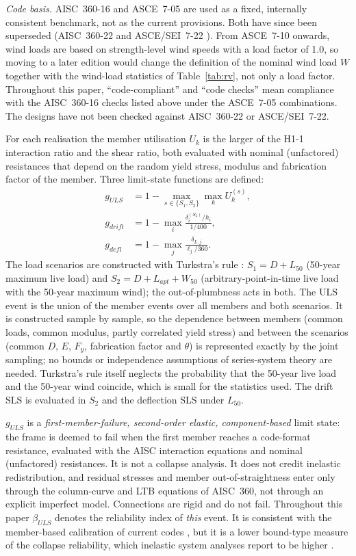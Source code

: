 \emph{Code basis.} AISC~360-16 and ASCE~7-05 are used as a fixed, internally consistent benchmark,
not as the current provisions. Both have since been superseded (AISC~360-22 \citep{AISC360_22} and
ASCE/SEI~7-22 \citep{ASCE722}). From ASCE~7-10 onwards, wind loads are based on strength-level wind
speeds with a load factor of 1.0, so moving to a later edition would change the definition of the
nominal wind load $W$ together with the wind-load statistics of Table~\ref{tab:rv}, not only a load
factor. Throughout this paper, ``code-compliant'' and ``code checks'' mean compliance with the
AISC~360-16 checks listed above under the ASCE~7-05 combinations. The designs have not been checked
against AISC~360-22 or ASCE/SEI~7-22.

For each realisation the member utilisation $U_k$ is the larger of the H1-1 interaction ratio
and the shear ratio, both evaluated with nominal (unfactored) resistances that depend on the
random yield stress, modulus and fabrication factor of the member. Three limit-state functions
are defined:
\begin{align}
g_{ULS} &= 1 - \max_{s\in\{S_1,S_2\}}\max_k U_k^{(s)}, \label{eq:gULS}\\
g_{drift} &= 1 - \max_i \frac{\delta_i^{(S_2)}/h_i}{1/400}, \label{eq:gdrift}\\
g_{defl} &= 1 - \max_j \frac{\delta_{L,j}}{\ell_j/360}. \label{eq:gdefl}
\end{align}
The load scenarios are constructed with Turkstra's rule \citep{TurkstraMadsen1980}:
$S_1 = D + L_{50}$ (50-year maximum live load) and $S_2 = D + L_{apt} + W_{50}$
(arbitrary-point-in-time live load with the 50-year maximum wind); the out-of-plumbness acts in
both. The ULS event is the union of the member events over all members and both scenarios. It is
constructed sample by sample, so the dependence between members (common loads, common modulus,
partly correlated yield stress) and between the scenarios (common $D$, $E$, $F_y$, fabrication
factor and $\theta$) is represented exactly by the joint sampling; no bounds or independence
assumptions of series-system theory are needed. Turkstra's rule itself neglects the probability
that the 50-year live load and the 50-year wind coincide, which is small for the statistics used.
The drift SLS is evaluated in $S_2$ and the deflection SLS under $L_{50}$.

$g_{ULS}$ is a \emph{first-member-failure, second-order elastic, component-based} limit state:
the frame is deemed to fail when the first member reaches a code-format resistance, evaluated with
the AISC interaction equations and nominal (unfactored) resistances. It is not a collapse
analysis. It does not credit inelastic redistribution, and residual stresses and member
out-of-straightness enter only through the column-curve and LTB equations of AISC~360, not through
an explicit imperfect model. Connections are rigid and do not fail. Throughout this paper
$\beta_{ULS}$ denotes the reliability index of \emph{this} event. It is consistent with the
member-based calibration of current codes \citep{Ellingwood1980}, but it is a lower bound-type
measure of the collapse reliability, which inelastic system analyses report to be higher
\citep{Buonopane2006,Zhang2016}.

